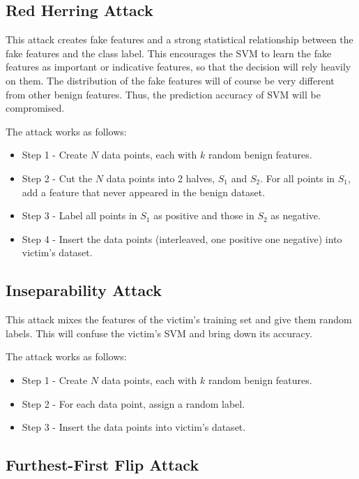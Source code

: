\documentclass[10pt,conference,compsocconf,letterpaper]{IEEEtran}
\begin{document}
\subsection{Red Herring Attack}

This attack creates fake features and a strong statistical relationship between the fake features and the class label. This encourages the SVM to learn the fake features as important or indicative features, so that the decision will rely heavily on them. The distribution of the fake features will of course be very different from other benign features. Thus, the prediction accuracy of SVM will be compromised.

The attack works as follows:

\begin{itemize}
\item Step 1 - Create $N$ data points, each with $k$ random benign features.
\item Step 2 - Cut the $N$ data points into 2 halves, $S_1$ and $S_2$. For all points in $S_1$, add a feature that never appeared in the benign dataset.
\item Step 3 - Label all points in $S_1$ as positive and those in $S_2$ as negative.
\item Step 4 - Insert the data points (interleaved, one positive one negative) into victim's dataset.
\end{itemize}

\subsection{Inseparability Attack}

This attack mixes the features of the victim's training set and give them random labels. This will confuse the victim's SVM and bring down its accuracy.

The attack works as follows:

\begin{itemize}
\item Step 1 - Create $N$ data points, each with $k$ random benign features.
\item Step 2 - For each data point, assign a random label.
\item Step 3 - Insert the data points into victim's dataset.
\end{itemize}

\subsection{Furthest-First Flip Attack}
\end{document}
